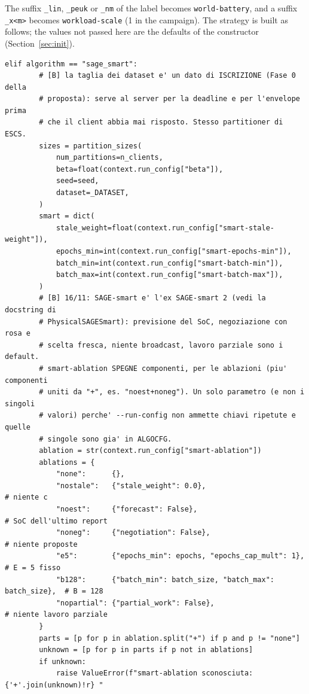 \documentclass[11pt,a4paper]{article}
\newcommand{\cf}[1]{\texttt{#1}}
\begin{document}
The suffix \cf{\_lin}, \cf{\_peuk} or \cf{\_nm} of the label becomes
\cf{world-battery}, and a suffix \cf{\_x<m>} becomes \cf{workload-scale} (1 in
the campaign). The strategy is built as follows; the values not passed here
are the defaults of the constructor (Section~\ref{sec:init}).

\begin{lstlisting}[style=py,firstnumber=174,caption={\texttt{tesifl/tesiFL/server\_app.py}, lines 174--249}]
    elif algorithm == "sage_smart":
        # [B] la taglia dei dataset e' un dato di ISCRIZIONE (Fase 0 della
        # proposta): serve al server per la deadline e per l'envelope prima
        # che il client abbia mai risposto. Stesso partitioner di ESCS.
        sizes = partition_sizes(
            num_partitions=n_clients,
            beta=float(context.run_config["beta"]),
            seed=seed,
            dataset=_DATASET,
        )
        smart = dict(
            stale_weight=float(context.run_config["smart-stale-weight"]),
            epochs_min=int(context.run_config["smart-epochs-min"]),
            batch_min=int(context.run_config["smart-batch-min"]),
            batch_max=int(context.run_config["smart-batch-max"]),
        )
        # [B] 16/11: SAGE-smart e' l'ex SAGE-smart 2 (vedi la docstring di
        # PhysicalSAGESmart): previsione del SoC, negoziazione con rosa e
        # scelta fresca, niente broadcast, lavoro parziale sono i default.
        # smart-ablation SPEGNE componenti, per le ablazioni (piu' componenti
        # uniti da "+", es. "noest+noneg"). Un solo parametro (e non i singoli
        # valori) perche' --run-config non ammette chiavi ripetute e quelle
        # singole sono gia' in ALGOCFG.
        ablation = str(context.run_config["smart-ablation"])
        ablations = {
            "none":      {},
            "nostale":   {"stale_weight": 0.0},                       # niente c
            "noest":     {"forecast": False},                         # SoC dell'ultimo report
            "noneg":     {"negotiation": False},                      # niente proposte
            "e5":        {"epochs_min": epochs, "epochs_cap_mult": 1},  # E = 5 fisso
            "b128":      {"batch_min": batch_size, "batch_max": batch_size},  # B = 128
            "nopartial": {"partial_work": False},                     # niente lavoro parziale
        }
        parts = [p for p in ablation.split("+") if p and p != "none"]
        unknown = [p for p in parts if p not in ablations]
        if unknown:
            raise ValueError(f"smart-ablation sconosciuta: {'+'.join(unknown)!r} "

\end{lstlisting}
\end{document}
